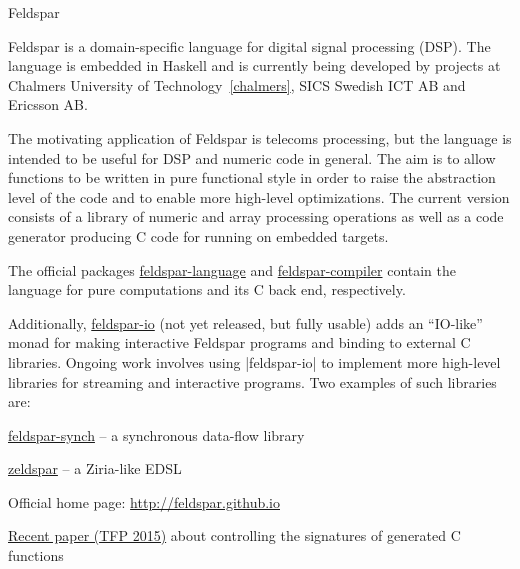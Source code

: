 \begin{hcarentry}{Feldspar}
\label{feldspar}
\makeheader

Feldspar is a domain-specific language for digital signal processing (DSP). The
language is embedded in Haskell and is currently being developed by projects at
Chalmers University of Technology~\cref{chalmers}, SICS Swedish ICT AB and
Ericsson AB.

The motivating application of Feldspar is telecoms processing, but the language
is intended to be useful for DSP and numeric code in general. The aim is to
allow functions to be written in pure functional style in order to raise the
abstraction level of the code and to enable more high-level optimizations. The
current version consists of a library of numeric and array processing operations
as well as a code generator producing C code for running on embedded targets.

The official packages \href{http://hackage.haskell.org/package/feldspar-language}{feldspar-language} and \href{http://hackage.haskell.org/package/feldspar-compiler}{feldspar-compiler} contain the language for pure computations and its C back end, respectively.

Additionally, \href{https://github.com/emilaxelsson/feldspar-io}{feldspar-io} (not yet released, but fully usable) adds an ``IO-like'' monad for making interactive Feldspar programs and binding to external C libraries. Ongoing work involves using \pre|feldspar-io| to implement more high-level libraries for streaming and interactive programs. Two examples of such libraries are:
\begin{compactitem}
\item \href{https://github.com/emilaxelsson/feldspar-synch}{feldspar-synch} -- a synchronous data-flow library
\item \href{https://github.com/koengit/zeldspar}{zeldspar} -- a Ziria-like EDSL
\end{compactitem}

\FurtherReading
\begin{compactitem}
\item Official home page: \url{http://feldspar.github.io}
\item \href{http://www.cse.chalmers.se/~emax/documents/persson2015programmable.pdf}{Recent paper (TFP 2015)} about controlling the signatures of generated C functions
\end{compactitem}
\end{hcarentry}

